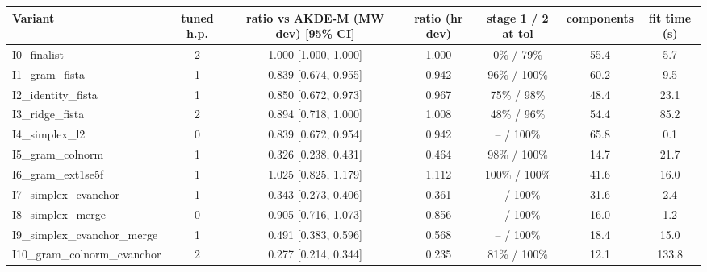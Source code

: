 \begin{tabular}{lcccccc}
\toprule
Variant & tuned h.p. & ratio vs AKDE-M (MW dev) [95\% CI] & ratio (hr dev) & stage 1 / 2 at tol & components & fit time (s) \\
\midrule
I0\_finalist & 2 & 1.000 [1.000, 1.000] & 1.000 & 0\% / 79\% & 55.4 & 5.7 \\
I1\_gram\_fista & 1 & 0.839 [0.674, 0.955] & 0.942 & 96\% / 100\% & 60.2 & 9.5 \\
I2\_identity\_fista & 1 & 0.850 [0.672, 0.973] & 0.967 & 75\% / 98\% & 48.4 & 23.1 \\
I3\_ridge\_fista & 2 & 0.894 [0.718, 1.000] & 1.008 & 48\% / 96\% & 54.4 & 85.2 \\
I4\_simplex\_l2 & 0 & 0.839 [0.672, 0.954] & 0.942 & -- / 100\% & 65.8 & 0.1 \\
I5\_gram\_colnorm & 1 & 0.326 [0.238, 0.431] & 0.464 & 98\% / 100\% & 14.7 & 21.7 \\
I6\_gram\_ext1se5f & 1 & 1.025 [0.825, 1.179] & 1.112 & 100\% / 100\% & 41.6 & 16.0 \\
I7\_simplex\_cvanchor & 1 & 0.343 [0.273, 0.406] & 0.361 & -- / 100\% & 31.6 & 2.4 \\
I8\_simplex\_merge & 0 & 0.905 [0.716, 1.073] & 0.856 & -- / 100\% & 16.0 & 1.2 \\
I9\_simplex\_cvanchor\_merge & 1 & 0.491 [0.383, 0.596] & 0.568 & -- / 100\% & 18.4 & 15.0 \\
I10\_gram\_colnorm\_cvanchor & 2 & 0.277 [0.214, 0.344] & 0.235 & 81\% / 100\% & 12.1 & 133.8 \\
\bottomrule
\end{tabular}